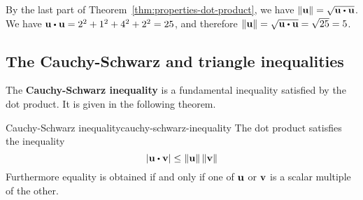 \begin{solution}
  By the last part of Theorem~\ref{thm:properties-dot-product}, we have
  $\norm{\vect{u}} = \sqrt {\vect{u} \dotprod \vect{u}}$. We have
  $\vect{u} \dotprod \vect{u} = 2^2+1^2+4^2+2^2 = 25$, and therefore
  $\norm{\vect{u}} = \sqrt{\vect{u} \dotprod \vect{u}} = \sqrt{25} = 5$.
\end{solution}

\subsection{The Cauchy-Schwarz and triangle inequalities}

The \textbf{Cauchy-Schwarz inequality}
is a fundamental inequality satisfied by the dot product.  It is given
in the following theorem.

\begin{theorem}{Cauchy-Schwarz inequality}{cauchy-schwarz-inequality}
  The dot product satisfies the inequality
  \begin{equation}\label{cauchy}
    \abs{\vect{u}\dotprod \vect{v}}\leq \norm{\vect{u}} \norm{\vect{v}}
  \end{equation}
  Furthermore equality is obtained if and only if one of $\mbox{\bf u}$ or $\mbox{\bf v}$ is a scalar multiple of the other.
\end{theorem}

